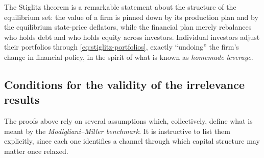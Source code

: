 \documentclass[11pt,a4paper,oneside]{book}
\theoremstyle{plain}
\theoremstyle{definition}
\theoremstyle{remark}
\numberwithin{equation}{chapter}
\begin{document}
The Stiglitz theorem is a remarkable statement about the structure of the equilibrium set: the value of a firm is pinned down by its production plan and by the equilibrium state-price deflators, while the financial plan merely rebalances who holds debt and who holds equity across investors.
Individual investors adjust their portfolios through \eqref{eq:stiglitz-portfolios}, exactly ``undoing'' the firm's change in financial policy, in the spirit of what is known as \emph{homemade leverage}.

\subsection{Conditions for the validity of the irrelevance results}

The proofs above rely on several assumptions which, collectively, define what is meant by the \emph{Modigliani--Miller benchmark}.
It is instructive to list them explicitly, since each one identifies a channel through which capital structure may matter once relaxed.
\end{document}
